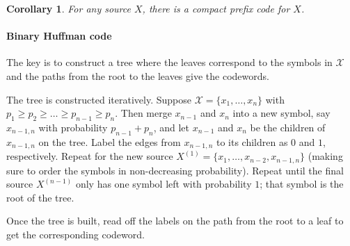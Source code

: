 \documentclass[a4paper, 11pt, openany]{article}
\numberwithin{equation}{section}
\theoremstyle{plain}
\newtheorem{corollary}	[equation]	{Corollary}
\theoremstyle{definition}
\begin{document}
\begin{corollary}
For any source $X$, there is a compact prefix code for $X$.
\end{corollary}


\paragraph{Binary Huffman code}


The key is to construct a tree where the leaves correspond to the symbols in  $\mathcal{X}$ and the paths from the root to the leaves give the codewords.

The tree is constructed iteratively. Suppose $\mathcal{X} = \{x_1, \dots, x_n\}$ with $p_1 \ge p_2 \ge  \dots \ge p_{n-1} \ge p_n$. Then merge $x_{n-1}$ and $x_n$ into a new symbol, say $x_{n-1, n}$ with probability $p_{n-1} + p_n$, and let $x_{n-1}$ and $x_n$ be the children of $x_{n-1, n}$ on the tree. Label the edges from $x_{n-1, n}$ to its children as $0$ and $1$, respectively. Repeat for the new source $X^{(1)} = \{x_1, \dots, x_{n-2}, x_{n-1, n} \}$ (making sure to order the symbols in non-decreasing probability). Repeat until the final source $X^{(n-1)}$ only has one symbol left with probability $1$; that symbol is the root of the tree. 

Once the tree is built, read off the labels on the path from the root to a leaf to get the corresponding codeword.
\end{document}

